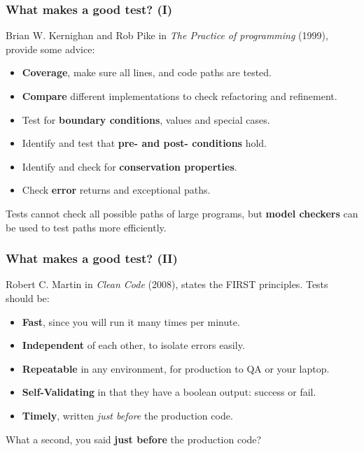 \documentclass{beamer} %
\newcommand\emc[1]{\textcolor{brightblue}{\textbf{#1}}}
\begin{document}
\begin{frame}
\frametitle{What makes a good test? (I)}

Brian W. Kernighan and Rob Pike in  \emph{The Practice of programming} (1999), provide some advice:
\begin{itemize}
	\item \emc{Coverage}, make sure all lines, and code paths are tested.
	\item \emc{Compare} different implementations to check refactoring and refinement.
	\item Test for \emc{boundary conditions}, values and special cases.
	\item Identify and test that \emc{pre- and post- conditions} hold.
	\item Identify and check for \emc{conservation properties}.
	\item Check \emc{error} returns and exceptional paths.
\end{itemize}

\vspace{3mm}
Tests cannot check all possible paths of large programs, but \emc{model checkers} can be used to test paths more efficiently.

\end{frame}

\begin{frame}
\frametitle{What makes a good test? (II)}

Robert C. Martin in \emph{Clean Code} (2008), states the FIRST principles. Tests should be:
\begin{itemize}
	\item \emc{Fast}, since you will run it many times per minute.
	\item \emc{Independent} of each other, to isolate errors easily. 
	\item \emc{Repeatable} in any environment, for production to QA or your laptop.
	\item \emc{Self-Validating} in that they have a boolean output: success or fail.
	\item \emc{Timely}, written \emph{just before} the production code.
\end{itemize}

\vspace{5mm}
What a second, you said \emc{just before} the production code?

\end{frame}
\end{document}

